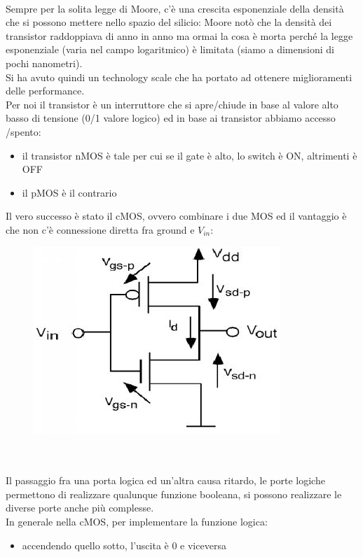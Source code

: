 \documentclass[oneside, 12pt]{extbook}
\begin{document}
\\Sempre per la solita legge di Moore, c'è una crescita esponenziale della densità che si possono mettere nello spazio del silicio: Moore notò che la densità dei transistor raddoppiava di anno in anno ma ormai la cosa è morta perché la legge esponenziale (varia nel campo logaritmico) è limitata (siamo a dimensioni di pochi nanometri).
\\Si ha avuto quindi un technology scale che ha portato ad ottenere miglioramenti delle performance.
\\Per noi il transistor è un interruttore che si apre/chiude in base al valore alto basso di tensione (0/1 valore logico) ed in base ai transistor abbiamo accesso /spento:
\begin{itemize}
	\item il transistor nMOS è tale per cui se il gate è alto, lo switch è ON, altrimenti è OFF
	\item il pMOS è il contrario
\end{itemize}
Il vero successo è stato il cMOS, ovvero combinare i due MOS ed il vantaggio è che non c'è connessione diretta fra ground e $V_{in}$:\\
\begin{figure}[!h]
	\includegraphics[scale=0.5]{immagini/hardware/cmos.png}
\end{figure}
\\\\Il passaggio fra una porta logica ed un'altra causa ritardo, le porte logiche permettono di realizzare qualunque funzione booleana, si possono realizzare le diverse porte anche più complesse.
\\In generale nella cMOS, per implementare la funzione logica:
\begin{itemize}
	\item accendendo quello sotto, l'uscita è 0 e viceversa
\end{itemize}
\end{document}
